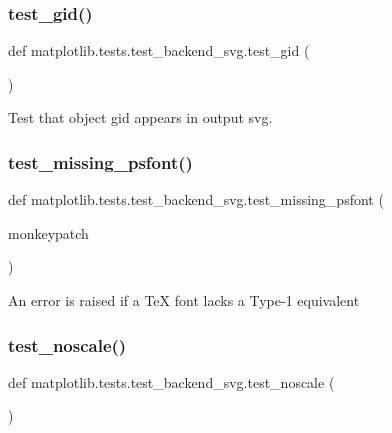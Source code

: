 \subsubsection{\texorpdfstring{test\+\_\+gid()}{test\_gid()}}
{\footnotesize\ttfamily def matplotlib.\+tests.\+test\+\_\+backend\+\_\+svg.\+test\+\_\+gid (\begin{DoxyParamCaption}{ }\end{DoxyParamCaption})}

\begin{DoxyVerb}Test that object gid appears in output svg.\end{DoxyVerb}
 \mbox{\label{namespacematplotlib_1_1tests_1_1test__backend__svg_a3b157613592125389c7a1306a735d46a}} 
\subsubsection{\texorpdfstring{test\+\_\+missing\+\_\+psfont()}{test\_missing\_psfont()}}
{\footnotesize\ttfamily def matplotlib.\+tests.\+test\+\_\+backend\+\_\+svg.\+test\+\_\+missing\+\_\+psfont (\begin{DoxyParamCaption}\item[{}]{monkeypatch }\end{DoxyParamCaption})}

\begin{DoxyVerb}An error is raised if a TeX font lacks a Type-1 equivalent\end{DoxyVerb}
 \mbox{\label{namespacematplotlib_1_1tests_1_1test__backend__svg_acfa908fc96b60d2db87f5ef717b18586}} 
\subsubsection{\texorpdfstring{test\+\_\+noscale()}{test\_noscale()}}
{\footnotesize\ttfamily def matplotlib.\+tests.\+test\+\_\+backend\+\_\+svg.\+test\+\_\+noscale (\begin{DoxyParamCaption}{ }\end{DoxyParamCaption})}

